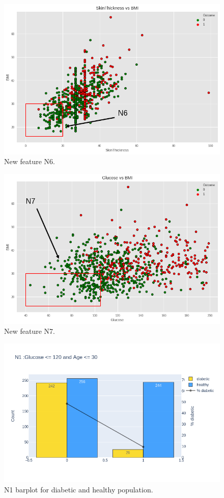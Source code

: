 \documentclass[12pt]{article}
\begin{document}
\begin{figure}[ht]
\centering
\includegraphics[width=1\textwidth]{download(4).png}
\caption{\label{fig:21}  New feature N6.}
\end{figure}

\begin{figure}[ht]
\centering
\includegraphics[width=1\textwidth]{download(5).png}
\caption{\label{fig:22}  New feature N7.}
\end{figure}

\begin{figure}[ht]
\centering
\includegraphics[width=1\textwidth]{newplot(13).png}
\caption{\label{fig:23} N1 barplot for diabetic and healthy population.}
\end{figure}
\end{document}
